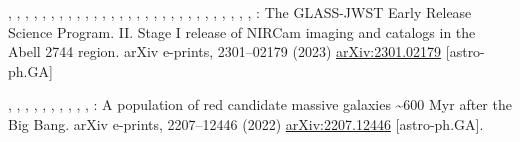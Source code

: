 \documentclass[sn-mathphys]{sn-jnl}%
\theoremstyle{thmstyleone}%
\theoremstyle{thmstyletwo}%
\theoremstyle{thmstylethree}%
\begin{document}
\begin{thebibliography}{125}
\begin{botherref}
,
,
,
,
,
,
,
,
,
,
,
,
,
,
,
,
,
,
,
,
,
,
,
,
,
,
,
,
,
:
{The GLASS-JWST Early Release Science Program. II. Stage I release of NIRCam
  imaging and catalogs in the Abell 2744 region}.
arXiv e-prints,
2301--02179
(2023)
{\href{https://arxiv.org/abs/2301.02179}{{arXiv:2301.02179}}}
{[astro-ph.GA]}
\end{botherref}
\endbibitem

\begin{botherref}
,
,
,
,
,
,
,
,
,
,
:
{A population of red candidate massive galaxies
  \raisebox{-0.5ex}\textasciitilde600 Myr after the Big Bang}.
arXiv e-prints,
2207--12446
(2022)
{\href{https://arxiv.org/abs/2207.12446}{{arXiv:2207.12446}}}
{[astro-ph.GA]}.
\end{botherref}
\endbibitem


\end{thebibliography}
\end{document}
